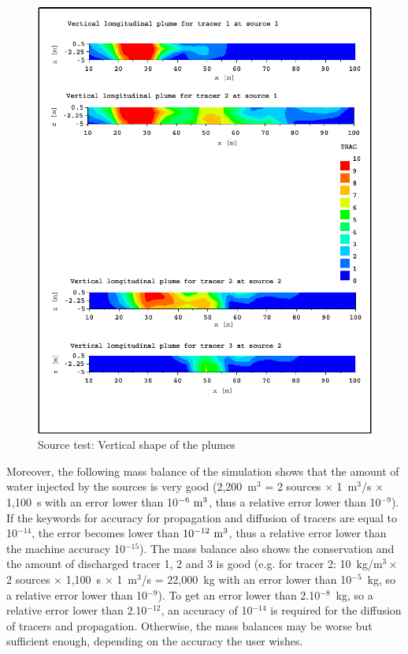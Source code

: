 \begin{figure} [H]
\centering
\includegraphics[scale=1.]{../img/source_ver_shape.pdf}
 \caption{Source test: Vertical shape of the plumes}
 \label{t3d:source:ver_shape}
\end{figure}

Moreover, the following mass balance of the  simulation
shows that the amount of water injected by the sources is very good
(2,200~m$^3$ = 2 sources $\times$ 1~m$^3$/s $\times$ 1,100~s
with an error lower than 10$^{-6}~\rm{m}^3$, thus a relative error
lower than 10$^{-9}$).
If the keywords for accuracy for propagation and diffusion of tracers
are equal to 10$^{-14}$, the error becomes lower than
$10^{-12}~\rm{m}^3$, thus a relative error lower than the machine
accuracy 10$^{-15}$).
The mass balance also shows the conservation and the amount of
discharged tracer 1, 2 and 3 is good
(e.g. for tracer 2: 10~kg/m$^3 \times$ 2 sources $\times$ 1,100~s
$\times$ 1~m$^3$/s = 22,000~kg with an error lower than 10$^{-5}$~kg,
so a relative error lower than 10$^{-9}$).
To get an error lower than 2.10$^{-8}$~kg, so a relative error lower
than 2.10$^{-12}$, an accuracy of 10$^{-14}$ is required for the
diffusion of tracers and propagation.
Otherwise, the mass balances may be worse but sufficient enough,
depending on the accuracy the user wishes.

